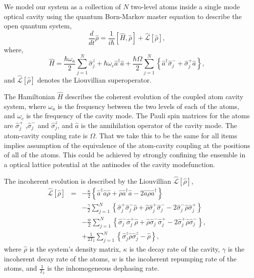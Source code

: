 \documentclass[aps,prl,twocolumn,
superscriptaddress,groupedaddress]{revtex4}
\begin{document}
We model our system as a collection of $N$ two-level atoms inside a
single mode optical cavity using the quantum Born-Markov master equation
to describe the open quantum system,
\begin{equation}
  \frac{d}{dt} \hat{\rho} =
  \frac{1}{i \hbar} \left[ \hat{H}, \hat{\rho} \right] +
  \hat{\mathcal{L}}\left[ \hat{\rho} \right],
\label{ME1Crossover}
\end{equation}
where,
\begin{equation}
\hat{H} = \frac{\hbar \omega_a}{2} \sum_{j=1}^{N} \hat{\sigma}^{z}_{j}
+ \hbar \omega_c \hat{a}^{\dagger}\hat{a}
+ \frac{\hbar \Omega}{2}  \sum_{j=1}^{N} \left\{
    \hat{a}^{\dagger} \hat{\sigma}^{-}_{j} +
    \hat{\sigma}^{+}_{j} \hat{a} \right\},
\end{equation}
and $\hat{\mathcal{L}}\left[ \hat{\rho} \right]$ denotes the
Liouvillian superoperator.

The Hamiltonian $\hat{H}$ describes the coherent evolution of the
coupled atom cavity system, where $\omega_{a}$ is the frequency
between the two levels of each of the atoms, and $\omega_c$ is the
frequency of the cavity mode. The Pauli spin matrices for the atoms
are $\hat{\sigma}_j^{+}$ ,$\hat{\sigma}_j^{-}$ and
$\hat{\sigma}_j^{z}$, and $\hat{a}$ is the annihilation operator of
the cavity mode. The atom-cavity coupling rate is $\Omega$. That we
take this to be the same for all items implies assumption of the
equivalence of the atom-cavity coupling at the positions of all of the
atoms. This could be achieved by strongly confining the ensemble in a
optical lattice potential at the antinodes of the cavity modefunction.

The incoherent evolution is described by the Liouvillian
$\hat{\mathcal{L}}\left[ \hat{\rho} \right]$,
\begin{eqnarray}
\hat{\mathcal{L}}\left[ \hat{\rho} \right] &=&
  -\frac{\kappa}{2}
  \left\{
    \hat{a}^{\dagger} \hat{a} \hat{\rho}
    + \hat{\rho}  \hat{a}^{\dagger} \hat{a}
    - 2\hat{a} \hat{\rho} \hat{a}^{\dagger}
  \right\}
\nonumber
\\
 &&-\frac{\gamma}{2} \sum_{j=1}^N
  \left\{
   \hat{\sigma}_{j}^{+} \hat{\sigma}_{j}^{-} \hat{\rho}
   + \hat{\rho} \hat{\sigma}_{j}^{+} \hat{\sigma}_{j}^{-}
   - 2\hat{\sigma}_{j}^{-} \hat{\rho} \hat{\sigma}_{j}^{+}
  \right\}
\nonumber
\\
 &&-\frac{w}{2} \sum_{j=1}^N
  \left\{
   \hat{\sigma}_{j}^{-} \hat{\sigma}_{j}^{+} \hat{\rho}
   + \hat{\rho} \hat{\sigma}_{j}^{-} \hat{\sigma}_{j}^{+}
   - 2\hat{\sigma}_{j}^{+} \hat{\rho}  \hat{\sigma}_{j}^{-}
  \right\},
\nonumber
\\
 &&+\frac{1}{2T_2} \sum_{j=1}^N
  \left\{
   \hat{\sigma}_{j}^{z} \hat{\rho}  \hat{\sigma}_{j}^{z} - \hat{\rho}
  \right\},
\end{eqnarray}
where $\hat{\rho}$ is the system's density matrix, $\kappa$ is the decay
rate of the cavity, $\gamma$ is the incoherent decay rate of the atoms,
$w$ is the incoherent repumping rate of the atoms, and $\frac{1}{T_2}$
is the inhomogeneous dephasing rate.
\end{document}
